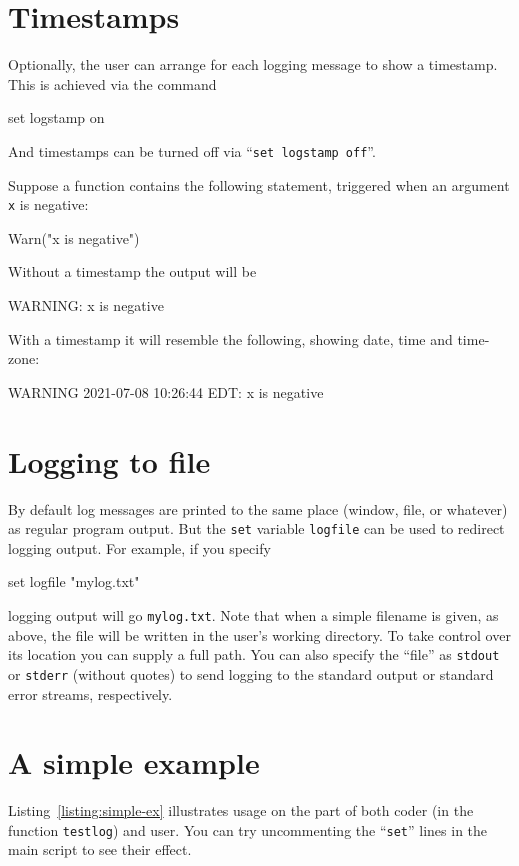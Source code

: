 \documentclass{article}
\begin{document}
\section{Timestamps}

Optionally, the user can arrange for each logging message to show a
timestamp. This is achieved via the command
\begin{code}
set logstamp on
\end{code}
And timestamps can be turned off via ``\texttt{set logstamp off}''.

Suppose a function contains the following statement, triggered when an
argument \texttt{x} is negative:
\begin{code}
Warn("x is negative")
\end{code}
Without a timestamp the output will be
\begin{code}
WARNING: x is negative
\end{code}
With a timestamp it will resemble the following, showing date, time
and time-zone:
\begin{code}
WARNING 2021-07-08 10:26:44 EDT: x is negative
\end{code}

\section{Logging to file}

By default log messages are printed to the same place (window, file,
or whatever) as regular program output. But the \texttt{set} variable
\texttt{logfile} can be used to redirect logging output. For example,
if you specify
\begin{code}
set logfile "mylog.txt"
\end{code}
logging output will go \texttt{mylog.txt}. Note that when a simple
filename is given, as above, the file will be written in the user's
working directory. To take control over its location you can supply a
full path. You can also specify the ``file'' as \texttt{stdout} or
\texttt{stderr} (without quotes) to send logging to the standard
output or standard error streams, respectively.

\section{A simple example}

Listing~\ref{listing:simple-ex} illustrates usage on the part of both
coder (in the function \texttt{testlog}) and user. You can try
uncommenting the ``\texttt{set}'' lines in the main script to see
their effect.
\end{document}
